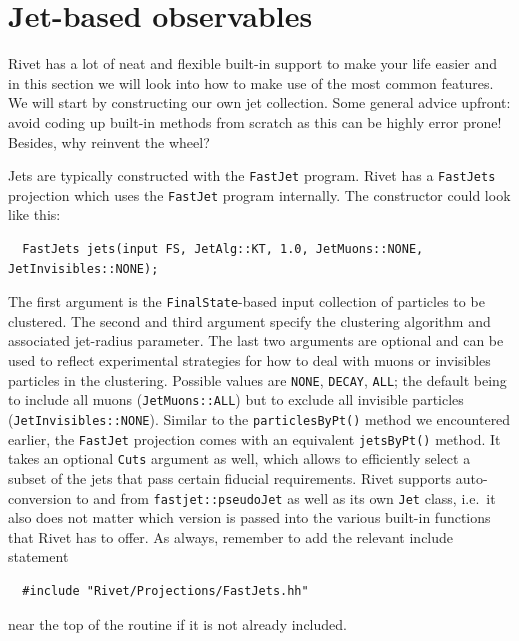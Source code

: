 \documentclass[10pt,fleqn]{scrartcl}
\theoremstyle{exstyle}
\begin{document}
\section{Jet-based observables}

Rivet has a lot of neat and flexible built-in support to make your life easier
and in this section we will look into how to make use of the most common features.
We will start by constructing our own jet collection.
Some general advice upfront: avoid coding up built-in methods from scratch
as this can be highly error prone! Besides, why reinvent the wheel?


Jets are typically constructed with the \texttt{FastJet} program.
Rivet has a \verb|FastJets| projection which uses the \texttt{FastJet}
program internally. The constructor could look like this:
\begin{small}
\begin{verbatim}
  FastJets jets(input FS, JetAlg::KT, 1.0, JetMuons::NONE, JetInvisibles::NONE);
\end{verbatim}
\end{small}
The first argument is the \verb|FinalState|-based input collection of particles to be clustered.
The second and third argument specify the clustering algorithm and associated jet-radius parameter.
The last two arguments are optional and can be used to reflect experimental strategies for
how to deal with muons or invisibles particles in the clustering.
Possible values are \verb|NONE|, \verb|DECAY|, \verb|ALL|; the default being
to include all muons (\verb|JetMuons::ALL|) but to exclude all invisible particles (\verb|JetInvisibles::NONE|).
Similar to the \verb|particlesByPt()| method we encountered earlier, the \verb|FastJet| projection
comes with an equivalent \verb|jetsByPt()| method. It takes an optional \verb|Cuts| argument as well,
which allows to efficiently select a subset of the jets that pass certain fiducial requirements.
Rivet supports auto-conversion to and from \verb|fastjet::pseudoJet| as well as its own \verb|Jet| class,
i.e.\ it also does not matter which version is passed into the various built-in functions that Rivet has to offer.
As always, remember to add the relevant include statement
\begin{verbatim}
  #include "Rivet/Projections/FastJets.hh"
\end{verbatim}
near the top of the routine if it is not already included.
\end{document}
